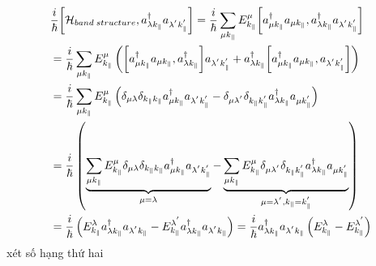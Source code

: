 \begin{align}
&\frac{i}{\hbar}\biggl[\mathcal{H}_{band \;structure},a_{\lambda k_{\parallel}}^{\dagger}a_{\lambda^{'} k_{\parallel}^{'}}\biggr]=\frac{i}{\hbar}\sum_{\mu k_{\parallel}}E_{k_{\parallel}}^{\mu}\biggl[a_{\mu k_{\parallel}}^{\dagger}a_{\mu k_{\parallel}},a_{\lambda k_{\parallel}}^{\dagger}a_{\lambda^{'} k_{\parallel}^{'}}\biggr]\notag\\
&=\frac{i}{\hbar} \sum_{\mu k_{\parallel}}E_{k_{\parallel}}^{\mu}
\left(\biggl[a_{\mu k_{\parallel}}^{\dagger}a_{\mu k_{\parallel}},a_{\lambda k_{\parallel}}^{\dagger}\biggr]a_{\lambda^{'} k_{\parallel}^{'}}
+a_{\lambda k_{\parallel}}^{\dagger}\biggl[a_{\mu k_{\parallel}}^{\dagger}a_{\mu k_{\parallel}},a_{\lambda^{'} k_{\parallel}^{'}}
\biggr] \right)\notag\\
&=\frac{i}{\hbar} \sum_{\mu k_{\parallel}}E_{k_{\parallel}}^{\mu}\left(
\delta_{\mu\lambda}\delta_{k_{\parallel}k_{\parallel}} a_{\mu k_{\parallel}}^{\dagger}a_{\lambda^{'}k_{\parallel}^{'}}
-\delta_{\mu \lambda^{'}}\delta_{k_{\parallel}k_{\parallel}^{'}}a_{\lambda k_{\parallel}}^{\dagger}a_{\mu k_{\parallel}^{'}}
\right)\notag\\
&=\frac{i}{\hbar}\left( \underbrace
{\sum_{\mu k_{\parallel}}E_{k_{\parallel}}^{\mu}
\delta_{\mu\lambda}\delta_{k_{\parallel}k_{\parallel}}a_{\mu k_{\parallel}}^{\dagger}a_{\lambda^{'}k_{\parallel}^{'}}}_{\mu =\lambda}
- \underbrace{\sum_{\mu k_{\parallel}}E_{k_{\parallel}}^{\mu}\delta_{\mu \lambda^{'}}\delta_{k_{\parallel}k_{\parallel}^{'}}a_{\lambda k_{\parallel}}^{\dagger}a_{\mu k_{\parallel}^{'}}}_{\mu=\lambda^{'},k_{\parallel}=k_{\parallel}^{'}}
\right)\notag\\
&=\frac{i}{\hbar} \left(E_{k_{\parallel}}^{\lambda}
 a_{\lambda k_{\parallel}}^{\dagger}a_{\lambda^{'}k_{\parallel}}
-E_{k_{\parallel}}^{\lambda^{'}} a_{\lambda k_{\parallel}}^{\dagger}a_{\lambda^{'} k_{\parallel}}
\right) = \frac{i}{\hbar} a_{\lambda k_{\parallel}}^{\dagger}a_{\lambda^{'} k_{\parallel}}\left(E_{k_{\parallel}}^{\lambda}-E_{k_{\parallel}}^{\lambda^{'}} \right)
\end{align}
xét số hạng thứ hai
